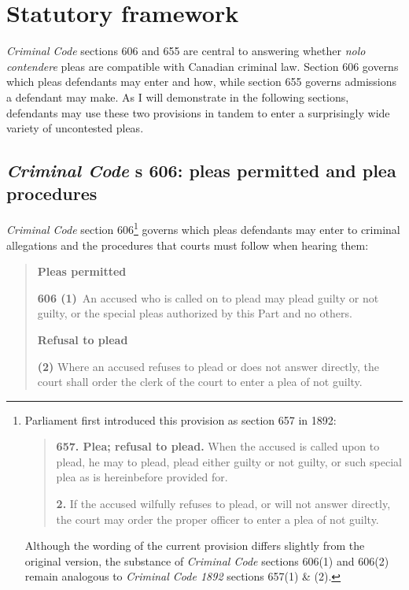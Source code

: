 \section{Statutory framework}

\textit{Criminal Code} sections 606 and 655 are central to answering whether \textit{nolo contendere} pleas are compatible with Canadian criminal law. Section 606 governs which pleas defendants may enter and how, while section 655 governs admissions a defendant may make. As I will demonstrate in the following sections, defendants may use these two provisions in tandem to enter a surprisingly wide variety of uncontested pleas.

\subsection{\textit{Criminal Code} s 606: pleas permitted and plea procedures}

\textit{Criminal Code} section 606\footnote{ Parliament first introduced this provision as section 657 in 1892:

\begin{quote}
\textbf{657. Plea; refusal to plead.} When the accused is called upon to plead, he may to plead, plead either guilty or not guilty, or such special plea as is hereinbefore provided for.

\textbf{2.} If the accused wilfully refuses to plead, or will not answer directly, the court may order the proper officer to enter a plea of not guilty. 
\end{quote}

Although the wording of the current provision differs slightly from the original version, the substance of \textit{Criminal Code} sections 606(1) and 606(2) remain analogous to \textit{Criminal Code 1892} sections 657(1) \& (2).} governs which pleas defendants may enter to criminal allegations and the procedures that courts must follow when hearing them:

\begin{quote}
    \onehalfspacing
    \textbf{Pleas permitted}
    
    \textbf{606 (1)} An accused who is called on to plead may plead guilty or not guilty, or the special pleas authorized by this Part and no others.\medskip

    \textbf{Refusal to plead}
    
    \textbf{(2)} Where an accused refuses to plead or does not answer directly, the court shall order the clerk of the court to enter a plea of not guilty.
    
\end{quote}

